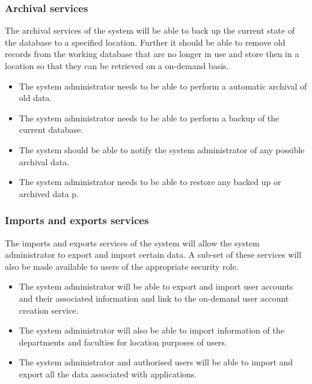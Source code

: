 \documentclass[12pt]{article}
\begin{document}
\subsubsection{Archival services}
	The archival services of the system will be able to back up the current state of the database to a specified location. Further it should be able to remove old records from the working database that are no longer in use and store then in a location so that they can be retrieved on a on-demand basis.
	\begin{itemize}		
		\item The system administrator needs to be able to perform a automatic archival of old data.
		\item The system administrator needs to be able to perform a backup of the current database.
		\item The system should be able to notify the system administrator of any possible archival data.
		\item The system administrator needs to be able to restore any backed up or archived data p.
	\end{itemize}
\subsubsection{Imports and exports services}
	The imports and exports services of the system will allow the system administrator to export and import certain data. A sub-set of these services will also be made available to users of the appropriate security role.
	\begin{itemize}		
		\item The system administrator will be able to export and import user accounts and their associated information and link to the on-demand user account creation service.
		\item The system administrator will also be able to import information of the departments and faculties for location purposes of users.
		\item The system administrator and authorised users will be able to import and export all the data associated with applications.
	\end{itemize}
\end{document}
